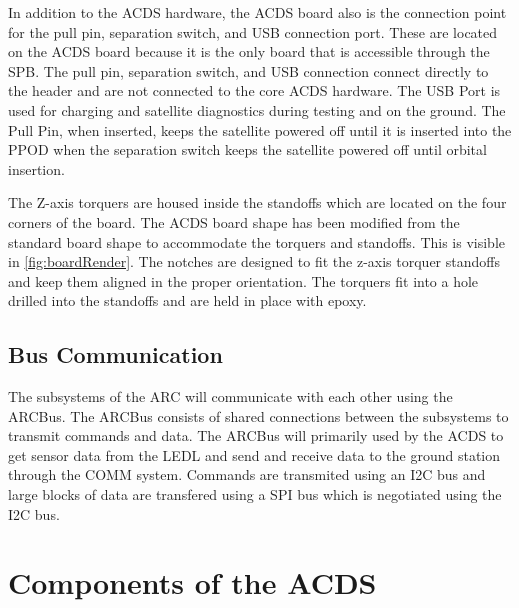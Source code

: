 In addition to the \ac{ACDS} hardware, the \ac{ACDS} board also is the connection point for the pull pin, separation switch, and \ac{USB} connection port. These are located on the \ac{ACDS} board because it is the only board that is accessible through the \ac{SPB}. The pull pin, separation switch, and \ac{USB} connection connect directly to the header and are not connected to the core \ac{ACDS} hardware. The \ac{USB} Port is used for charging and satellite diagnostics during testing and on the ground. The Pull Pin, when inserted, keeps the satellite powered off until it is inserted into the \ac{PPOD} when the separation switch keeps the satellite powered off until orbital insertion.

The Z-axis torquers are housed inside the standoffs which are located on the four corners of the board. The \ac{ACDS} board shape has been modified from the standard board shape to accommodate the torquers and standoffs. This is visible in \cref{fig:boardRender}. The notches are designed to fit the z-axis torquer standoffs and keep them aligned in the proper orientation. The torquers fit into a hole drilled into the standoffs and are held in place with epoxy. 

\subsection{Bus Communication}

The subsystems of the \ac{ARC} will communicate with each other using the ARCBus. The ARCBus consists of shared connections between the subsystems to transmit commands and data. The ARCBus will primarily used by the \ac{ACDS} to get sensor data from the \ac{LEDL} and send and receive data to the ground station through the COMM system. Commands are transmited using an \ac{I2C} bus and large blocks of data are transfered using a \ac{SPI} bus which is negotiated using the \ac{I2C} bus.

\section{Components of the \acl*{ACDS}}


